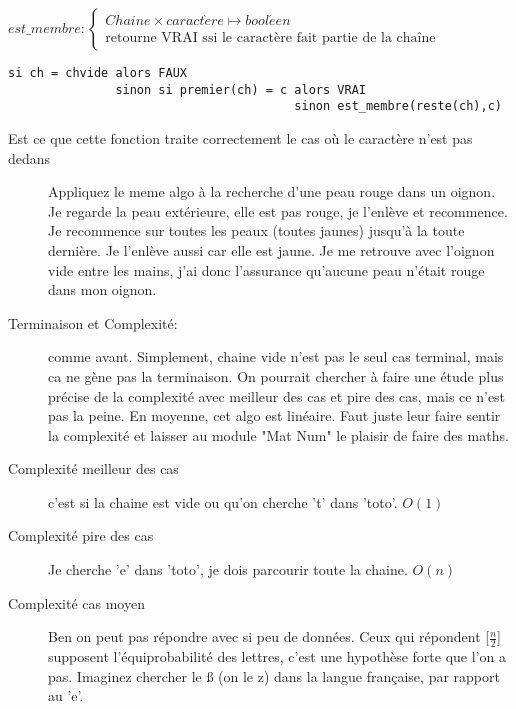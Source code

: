 \documentclass[10pt]{article}\usepackage[correction,nu]{esial}
\begin{document}
\begin{Question}
  $est\_membre: \left\{
    \begin{array}{l}
      Chaine\times caract\grave{e}re\mapsto bool\acute{e}en\\
      \text{retourne VRAI ssi le caractère fait partie de la chaîne}
    \end{array}\right.$  
\end{Question}
\begin{Reponse}
  \begin{Verbatim}[label=est\_membre(ch\quotesinglbase c)]
si ch = chvide alors FAUX
               sinon si premier(ch) = c alors VRAI
                                        sinon est_membre(reste(ch),c)    
  \end{Verbatim}
  \begin{description}
  \item[Est ce que cette fonction traite correctement le cas où le caractère
    n'est pas dedans] Appliquez le meme algo à la recherche d'une peau rouge
    dans un oignon. Je regarde la peau extérieure, elle est pas rouge, je
    l'enlève et recommence. Je recommence sur toutes les peaux (toutes jaunes)
    jusqu'à la toute dernière. Je l'enlève aussi car elle est jaune. Je me
    retrouve avec l'oignon vide entre les mains, j'ai donc l'assurance
    qu'aucune peau n'était rouge dans mon oignon.
  \item[Terminaison et Complexité:] comme avant. Simplement, chaine vide n'est
    pas le seul cas terminal, mais ca ne gène pas la terminaison. On pourrait
    chercher à faire une étude plus précise de la complexité avec meilleur des
    cas et pire des cas, mais ce n'est pas la peine. En moyenne, cet algo est
    linéaire. Faut juste leur faire sentir la complexité et laisser au module
    "Mat Num" le plaisir de faire des maths.
  \item[Complexité meilleur des cas] c'est si la chaine est vide ou qu'on
    cherche 't' dans 'toto'. $O(1)$
  \item[Complexité pire des cas] Je cherche 'e' dans 'toto', je dois parcourir
    toute la chaine. $O(n)$
  \item[Complexité cas moyen] Ben on peut pas répondre avec si peu de
    données. Ceux qui répondent [$\frac{n}{2}$] supposent l'équiprobabilité des
    lettres, c'est une hypothèse forte que l'on a pas. Imaginez chercher le ß
    (on le z) dans la langue française, par rapport au 'e'.
  \end{description}
\end{Reponse}
\end{document}
